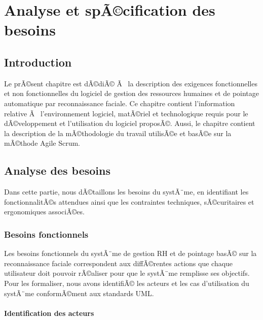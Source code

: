 ﻿\chapter{Analyse et spÃ©cification des besoins}

\newpage

\section{Introduction}

Le prÃ©sent chapitre est dÃ©diÃ© Ã  la description des exigences fonctionnelles et non
fonctionnelles du logiciel de gestion des ressources humaines et de pointage automatique
par reconnaissance faciale. Ce chapitre contient l'information relative Ã  l'environnement
logiciel, matÃ©riel et technologique requis pour le dÃ©veloppement et l'utilisation du
logiciel proposÃ©. Aussi, le chapitre contient la description de la mÃ©thodologie du travail
utilisÃ©e et basÃ©e sur la mÃ©thode Agile Scrum.

\section{Analyse des besoins}

Dans cette partie, nous dÃ©taillons les besoins du systÃ¨me, en identifiant les
fonctionnalitÃ©s attendues ainsi que les contraintes techniques, sÃ©curitaires et
ergonomiques associÃ©es.

\subsection{Besoins fonctionnels}

Les besoins fonctionnels du systÃ¨me de gestion RH et de pointage basÃ© sur la reconnaissance
faciale correspondent aux diffÃ©rentes actions que chaque utilisateur doit pouvoir rÃ©aliser
pour que le systÃ¨me remplisse ses objectifs. Pour les formaliser, nous avons identifiÃ© les
acteurs et les cas d'utilisation du systÃ¨me conformÃ©ment aux standards UML.

\subsubsection{Identification des acteurs}

